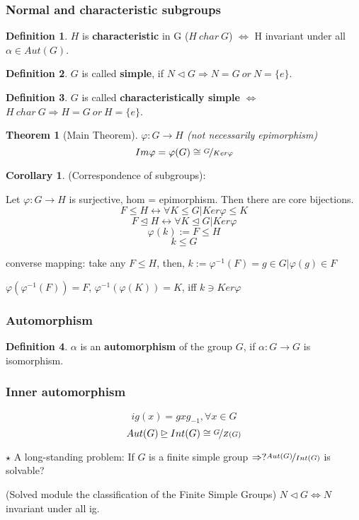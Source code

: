 \documentclass[12pt, a4paper]{article}
\newtheorem{theorem}{Theorem}[section]
\theoremstyle{definition}
\newtheorem{definition}{Definition}[section]
\newtheorem{corollary}{Corollary}[theorem]
\begin{document}
\subsubsection{Normal and characteristic subgroups}
\begin{definition}
$H$ is \textbf{characteristic} in G ($H\ char\ G$) $\Leftrightarrow$ H invariant under all 
$\alpha \in Aut(G)$.
\end{definition}
\begin{definition}
$G$ is called \textbf{simple}, if $N\lhd G \Rightarrow N=G\ or\ N = \{e\} $.
\end{definition}
\begin{definition}
$G$ is called \textbf{characteristically simple}
$\Leftrightarrow$ $H\ char\ G\Rightarrow H=G\ or\ H=\{e\} $.
\end{definition}
\begin{theorem}[Main Theorem]
    \par
    $\varphi :G\rightarrow H $ (not necessarily  epimorphism)
    \[Im \varphi = \varphi (G) \cong \nicefrac{G}{Ker\varphi}\]
\end{theorem}
\par
\begin{corollary}
    (Correspondence of subgroups):
\end{corollary}
\par
Let $\varphi :G\rightarrow H$ is surjective, hom = epimorphism. Then there are core 
bijections.
\[{F\leqslant H}\leftrightarrow {\forall K\leqslant G | Ker\varphi}\leqslant K\]
\[{F\unlhd H}\leftrightarrow {\forall K\unlhd G | Ker \varphi} \]
\[\varphi(k) := F\leqslant H \]
\[k\leqslant G\]
\par
converse mapping: take any $F\leqslant H $, then, 
$k:=\varphi^{-1}(F)= {g\in G|\varphi (g)\in F} $ \par
$\varphi(\varphi^{-1}(F))=F $, $\varphi^{-1}(\varphi(K))=K $, iff $k\ni Ker\varphi  $
\subsubsection{Automorphism}
\begin{definition}
$\alpha$ is an \textbf{automorphism} of the group $G$, if $\alpha:G\rightarrow G $ is 
isomorphism.
\end{definition}
\subsubsection{Inner automorphism}
\par
\[ig(x)=gxg_{-1}, \forall x\in G\]
\[Aut(G) \unrhd Int(G) \cong \nicefrac{G}{Z(G)} \]
\par
$\star$ A long-standing problem: If $G$ is a finite simple group 
$\Rightarrow ? \nicefrac{Aut(G)}{Int(G)}$ is solvable?
\par
(Solved module the classification of the Finite Simple Groups)
$N \lhd G\Leftrightarrow N$ invariant under all ig.
\newpage
\end{document}
